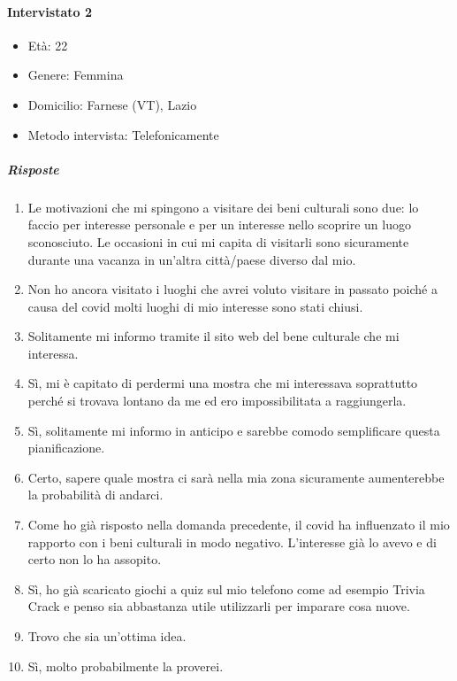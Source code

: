 \documentclass{article}
\begin{document}
\paragraph{Intervistato 2}
\begin{itemize}
\item Età: 22
\item Genere: Femmina
\item Domicilio: Farnese (VT), Lazio
\item Metodo intervista: Telefonicamente
\end{itemize}
\subparagraph{Risposte}
\begin{enumerate}
\item Le motivazioni che mi spingono a visitare dei beni culturali sono due: lo faccio per interesse personale e per un interesse nello scoprire un luogo sconosciuto. Le occasioni in cui mi capita di visitarli sono sicuramente durante una vacanza in un’altra città/paese diverso dal mio.
\item Non ho ancora visitato i luoghi che avrei voluto visitare in passato poiché a causa del covid molti luoghi di mio interesse sono stati chiusi.
\item Solitamente mi informo tramite il sito web del bene culturale che mi interessa.
\item Sì, mi è capitato di perdermi una mostra che mi interessava soprattutto perché si trovava lontano da me ed ero impossibilitata a raggiungerla.
\item Sì, solitamente mi informo in anticipo e sarebbe comodo semplificare questa pianificazione.
\item Certo, sapere quale mostra ci sarà nella mia zona sicuramente aumenterebbe la probabilità di andarci.
\item Come ho già risposto nella domanda precedente, il covid ha influenzato il mio rapporto con i beni culturali in modo negativo. L’interesse già lo avevo e di certo non lo ha assopito.
\item Sì, ho già scaricato giochi a quiz sul mio telefono come ad esempio Trivia Crack e penso sia abbastanza utile utilizzarli per imparare cosa nuove.
\item Trovo che sia un’ottima idea.
\item Sì, molto probabilmente la proverei.
\end{enumerate}
\end{document}
